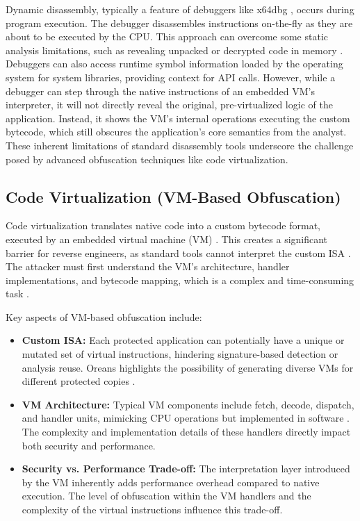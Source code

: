 Dynamic disassembly, typically a feature of debuggers like x64dbg \cite{Dun14}, occurs during program execution. The debugger disassembles instructions on-the-fly as they are about to be executed by the CPU. This approach can overcome some static analysis limitations, such as revealing unpacked or decrypted code in memory \cite{Sikorski2012}. Debuggers can also access runtime symbol information loaded by the operating system for system libraries, providing context for API calls. However, while a debugger can step through the native instructions of an embedded VM's interpreter, it will not directly reveal the original, pre-virtualized logic of the application. Instead, it shows the VM's internal operations executing the custom bytecode, which still obscures the application's core semantics from the analyst. These inherent limitations of standard disassembly tools underscore the challenge posed by advanced obfuscation techniques like code virtualization.

\subsection{Code Virtualization (VM-Based Obfuscation)}
Code virtualization translates native code into a custom bytecode format, executed by an embedded virtual machine (VM) \cite{Ore06, Zho24}. This creates a significant barrier for reverse engineers, as standard tools cannot interpret the custom ISA \cite{Sal18}. The attacker must first understand the VM's architecture, handler implementations, and bytecode mapping, which is a complex and time-consuming task \cite{Don20, Hac24}.

Key aspects of VM-based obfuscation include:
\begin{itemize}
    \item \textbf{Custom ISA:} Each protected application can potentially have a unique or mutated set of virtual instructions, hindering signature-based detection or analysis reuse. Oreans highlights the possibility of generating diverse VMs for different protected copies \cite{Ore06}.
    \item \textbf{VM Architecture:} Typical VM components include fetch, decode, dispatch, and handler units, mimicking CPU operations but implemented in software \cite{Sal18, Hac24}. The complexity and implementation details of these handlers directly impact both security and performance.
    \item \textbf{Security vs. Performance Trade-off:} The interpretation layer introduced by the VM inherently adds performance overhead compared to native execution. The level of obfuscation within the VM handlers and the complexity of the virtual instructions influence this trade-off.
\end{itemize}

